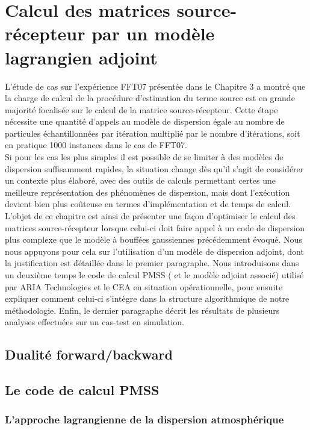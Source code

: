 \chapter{Calcul des matrices source-récepteur par un modèle lagrangien adjoint}

L'étude de cas sur l'expérience FFT07 présentée dans le Chapitre 3 a montré que la charge de calcul de la procédure d'estimation du terme source est en grande majorité focalisée sur le calcul de la matrice source-récepteur. Cette étape nécessite une quantité d'appels au modèle de dispersion égale au nombre de particules échantillonnées par itération multiplié par le nombre d'itérations, soit en pratique 1000 instances dans le cas de FFT07. \\
Si pour les cas les plus simples il est possible de se limiter à des modèles de dispersion suffisamment rapides, la situation change dès qu'il s'agit de considérer un contexte plus élaboré, avec des outils de calculs permettant certes une meilleure représentation des phénomènes de dispersion, mais dont l'exécution devient bien plus coûteuse en termes d'implémentation et de temps de calcul. \\
L'objet de ce chapitre est ainsi de présenter une façon d'optimiser le calcul des matrices source-récepteur lorsque celui-ci doit faire appel à un code de dispersion plus complexe que le modèle à bouffées gaussiennes précédemment évoqué. Nous nous appuyons pour cela sur l'utilisation d'un modèle de dispersion adjoint, dont la justification est détaillée dans le premier paragraphe. Nous introduisons dans un deuxième temps le code de calcul PMSS ( et le modèle adjoint associé) utilisé par ARIA Technologies et le CEA en situation opérationnelle, pour ensuite expliquer comment celui-ci s'intègre dans la structure algorithmique de notre méthodologie. Enfin, le dernier paragraphe décrit les résultats de plusieurs analyses effectuées sur un cas-test en simulation.

\section{Dualité forward/backward}

\section{Le code de calcul PMSS}

\subsection{L'approche lagrangienne de la dispersion atmosphérique}

